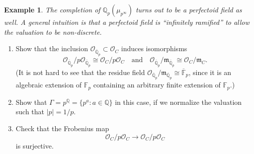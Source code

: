 \documentclass[12pt]{article}  %
\newtheorem{example}{Example}
\begin{document}
\begin{example}
The completion of $\mathbb{Q}_p(\mu_{p^\infty})$ turns out to be a perfectoid field as well.  
A general intuition is that a perfectoid field is ``infinitely ramified'' to allow the valuation to be non-discrete.
\end{example}

\begin{problem}[1]
\leavevmode
\begin{enumerate}[label=(\arabic*)]
\item Show that the inclusion $\mathcal{O}_{\overline{\mathbb{Q}}_p} \subset \mathcal{O}_C$ induces isomorphisms
\[
\mathcal{O}_{\overline{\mathbb{Q}}_p}/p\mathcal{O}_{\overline{\mathbb{Q}}_p} \cong \mathcal{O}_C/p\mathcal{O}_C
\quad \text{and} \quad
\mathcal{O}_{\overline{\mathbb{Q}}_p}/\mathfrak{m}_{\overline{\mathbb{Q}}_p} \cong \mathcal{O}_C/\mathfrak{m}_C.
\]
(It is not hard to see that the residue field $\mathcal{O}_{\overline{\mathbb{Q}}_p}/\mathfrak{m}_{\overline{\mathbb{Q}}_p} \cong \overline{\mathbb{F}}_p$, since it is an algebraic extension of $\mathbb{F}_p$ containing an arbitrary finite extension of $\mathbb{F}_p$.)
\item Show that $\Gamma = p^{\mathbb{Q}} = \{p^a : a \in \mathbb{Q}\}$ in this case, if we normalize the valuation such that $|p| = 1/p$.
\item Check that the Frobenius map 
\[
\mathcal{O}_C/p\mathcal{O}_C \to \mathcal{O}_C/p\mathcal{O}_C
\]
is surjective.
\end{enumerate}
\end{problem}
\end{document}
